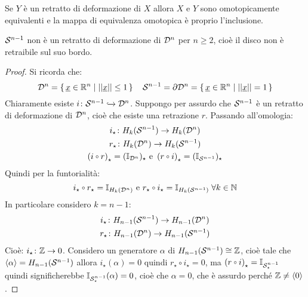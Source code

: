 \begin{osservation}
  Se $ Y $ è un retratto di deformazione di $ X $ allora $ X $ e $ Y $ sono
  omotopicamente equivalenti e la mappa di equivalenza omotopica è proprio
  l'inclusione.
\end{osservation}
\begin{corollary}
  $ \mathcal{S}^{n-1} $ non è un retratto di deformazione di $ \mathcal{D}^{n} $ per $ n \geq 2 $,
  cioè il disco non è retraibile sul suo bordo.
\end{corollary}
\begin{proof}
  Si ricorda che:
  \[
    \mathcal{D}^{n} = \set{ \underline{x} \in \mathbb{R}^{n} | || \underline{x} || \leq 1} \quad \mathcal{S}^{n-1} = \partial \mathcal{D}^{n} = \set{ \underline{x} \in \mathbb{R}^{n} | || \underline{x} || = 1}
  \]
  Chiaramente esiste $ i \colon \mathcal{S}^{n-1} \xhookrightarrow{} \mathcal{D}^{n} $.
  Suppongo per assurdo che $ \mathcal{S}^{n-1} $ è un retratto di deformazione di $ \mathcal{D}^{n} $, cioè che
  esiste una retrazione $ r $. Passando all'omologia:
  \begin{gather*}
    i_\star \colon H_k(\Sph{n-1}) \to H_k(\Disk{n}) \\
    r_\star \colon H_k(\Disk{n}) \to H_k(\Sph{n-1}) \\
    \left( i \circ r \right)_\star = (\Id{\Disk{n}})_\star \text{ e }  \left( r \circ i \right)_\star = (\Id{\Sph{n-1}})_\star
  \end{gather*}
  Quindi per la funtorialità:
  \[
    i_\star \circ r_\star = \Id{H_k(\Disk{n})} \text{ e } r_\star \circ i_\star = \Id{H_k(\Sph{n-1})} \; \forall k \in \mathbb{N}
  \]
  In particolare considero $ k = n - 1 $:
  \begin{gather*}
    i_\star \colon H_{n-1}(\mathcal{S}^{n-1}) \to H_{n-1}(\mathcal{D}^{n}) \\
    r_\star \colon H_{n-1}(\mathcal{D}^{n}) \to H_{n-1}(\mathcal{S}^{n-1})
  \end{gather*}
  Cioè: $ i_\star \colon \mathbb{Z} \to 0 $. Considero un generatore $ \alpha $ di $ H_{n-1}(\mathcal{S}^{n-1}) \cong \mathbb{Z} $, cioè tale
  che $ \langle\alpha\rangle = H_{n-1}(\mathcal{S}^{n-1}) $ allora $ i_\star(\alpha) = 0 $ quindi $ r_\star \circ i_\star = 0 $, ma
  $ \left( r \circ i \right)_\star = \Id{\Sph{n-1}_\star} $ quindi significherebbe $ \mathbb{I}_{\mathcal{S}^{n-1}_\star}(\alpha) = 0 $,
  cioè che $ \alpha = 0 $, che è assurdo perché $ \mathbb{Z} \not = \langle0\rangle $.
\end{proof}


